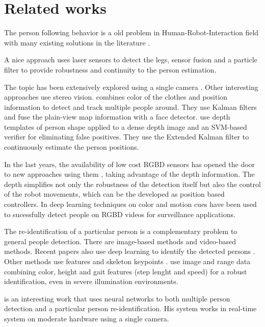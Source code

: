 \section{Related works}

The person following behavior is a old problem in Human-Robot-Interaction field with many existing solutions in the literature \cite{sidenbladh1999person,rocapal2005,yoshimi2006development}. 

A nice approach \cite{aguirre2016multisensor} uses laser sensors to detect the legs, sensor fusion and a particle filter to provide robustness and continuity to the person estimation. 

The topic has been extensively explored using a single camera \cite{yoshimi2006development}. Other interesting approaches use stereo vision. \cite{munoz2007people} combines color of the clothes and position information to detect and track multiple people around. They use Kalman filters and fuse the plain-view map information with a face detector. \cite{satake2009robust} use depth templates of person shape applied to a dense depth image and an SVM-based verifier for eliminating false positives. They use the Extended Kalman filter to continuously estimate the person positions.

In the last years, the availability of low cost RGBD sensors has opened the door to new approaches using them \cite{ilias2014nurse,shimura2014research}, taking advantage of the depth information. The depth simplifies not only the robustness of the detection itself but also the control of the robot movements, which can be the developed as position based controllers. In \cite{xue2016tracking} deep learning techniques on color and motion cues have been used to sucessfully detect people on RGBD videos for surveillance applications.

The re-identification of a particular person is a complementary problem to general people detection. There are image-based methods and video-based methods. Recent papers also use deep learning to identify the detected persons \cite{yoon2016person}. Other methods use features and skeleton keypoints \cite{munaro2014feature}. \cite{koide2016identification} use image and range data combining color, height and gait features (step lenght and speed) for a robust identification, even in severe illumination environments.

\cite{welsh2017real} is an interesting work that uses neural networks to both multiple person detection and a particular person re-identification. His system works in real-time system on moderate hardware using a single camera. 

